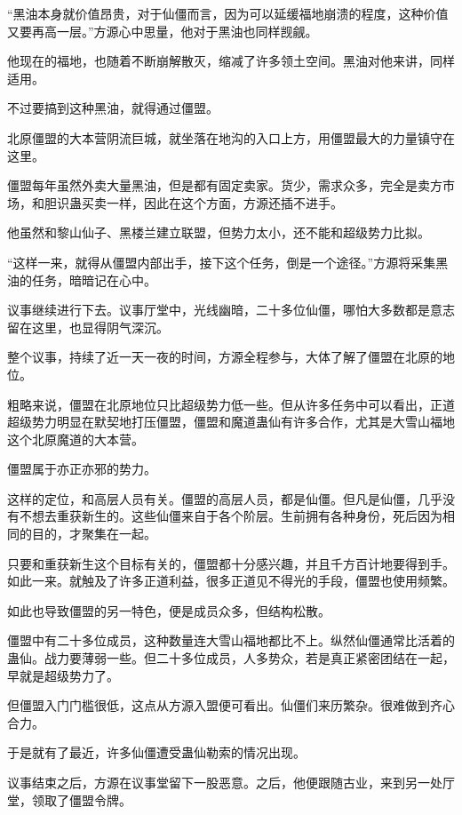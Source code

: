 
\begin{this_body}

“黑油本身就价值昂贵，对于仙僵而言，因为可以延缓福地崩溃的程度，这种价值又要再高一层。”方源心中思量，他对于黑油也同样觊觎。

他现在的福地，也随着不断崩解散灭，缩减了许多领土空间。黑油对他来讲，同样适用。

不过要搞到这种黑油，就得通过僵盟。

北原僵盟的大本营阴流巨城，就坐落在地沟的入口上方，用僵盟最大的力量镇守在这里。

僵盟每年虽然外卖大量黑油，但是都有固定卖家。货少，需求众多，完全是卖方市场，和胆识蛊买卖一样，因此在这个方面，方源还插不进手。

他虽然和黎山仙子、黑楼兰建立联盟，但势力太小，还不能和超级势力比拟。

“这样一来，就得从僵盟内部出手，接下这个任务，倒是一个途径。”方源将采集黑油的任务，暗暗记在心中。

议事继续进行下去。议事厅堂中，光线幽暗，二十多位仙僵，哪怕大多数都是意志留在这里，也显得阴气深沉。

整个议事，持续了近一天一夜的时间，方源全程参与，大体了解了僵盟在北原的地位。

粗略来说，僵盟在北原地位只比超级势力低一些。但从许多任务中可以看出，正道超级势力明显在默契地打压僵盟，僵盟和魔道蛊仙有许多合作，尤其是大雪山福地这个北原魔道的大本营。

僵盟属于亦正亦邪的势力。

这样的定位，和高层人员有关。僵盟的高层人员，都是仙僵。但凡是仙僵，几乎没有不想去重获新生的。这些仙僵来自于各个阶层。生前拥有各种身份，死后因为相同的目的，才聚集在一起。

只要和重获新生这个目标有关的，僵盟都十分感兴趣，并且千方百计地要得到手。如此一来。就触及了许多正道利益，很多正道见不得光的手段，僵盟也使用频繁。

如此也导致僵盟的另一特色，便是成员众多，但结构松散。

僵盟中有二十多位成员，这种数量连大雪山福地都比不上。纵然仙僵通常比活着的蛊仙。战力要薄弱一些。但二十多位成员，人多势众，若是真正紧密团结在一起，早就是超级势力了。

但僵盟入门门槛很低，这点从方源入盟便可看出。仙僵们来历繁杂。很难做到齐心合力。

于是就有了最近，许多仙僵遭受蛊仙勒索的情况出现。

议事结束之后，方源在议事堂留下一股恶意。之后，他便跟随古业，来到另一处厅堂，领取了僵盟令牌。


\end{this_body}
